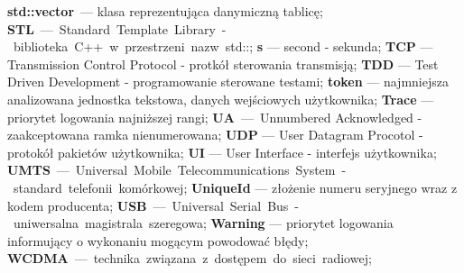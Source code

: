 \textbf{std::vector} --- klasa reprezentująca danymiczną tablicę;\newline
\textbf{STL} --- Standard Template Library - biblioteka C++ w przestrzeni nazw std::;\newline
\textbf{s} --- second - sekunda;\newline
\textbf{TCP} --- Transmission Control Protocol - protkół sterowania transmisją;\newline
\textbf{TDD} --- Test Driven Development - programowanie sterowane testami;\newline
\textbf{token} --- najmniejsza analizowana jednostka tekstowa, danych wejściowych użytkownika;\newline
\textbf{Trace} --- priorytet logowania najniższej rangi;\newline
\textbf{UA} --- Unnumbered Acknowledged - zaakceptowana ramka nienumerowana;\newline
\textbf{UDP} --- User Datagram Procotol - protokół pakietów użytkownika;\newline
\textbf{UI} --- User Interface - interfejs użytkownika;\newline
\textbf{UMTS} --- Universal Mobile Telecommunications System - standard telefonii komórkowej;\newline
\textbf{UniqueId} --- złożenie numeru seryjnego wraz z kodem producenta;\newline
\textbf{USB} --- Universal Serial Bus - uniwersalna magistrala szeregowa;\newline
\textbf{Warning} --- priorytet logowania informujący o wykonaniu mogącym powodować błędy;\newline
\textbf{WCDMA} --- technika związana z dostępem do sieci radiowej;\newline
